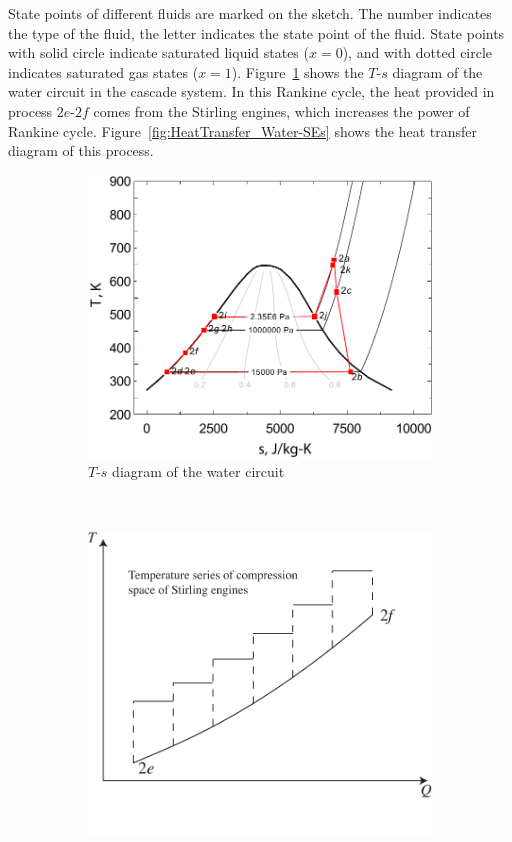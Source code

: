 State points of different fluids are marked on the sketch. The number indicates the type of the fluid, the letter indicates the state point of the fluid. State points with solid circle indicate saturated liquid states ($x = 0$), and with dotted circle indicates saturated gas states ($x = 1$). Figure~\ref{fig:T-s_Water2} shows the $T$-$s$ diagram of the water circuit in the cascade system. In this Rankine cycle, the heat provided in process $2e$-$2f$ comes from the Stirling engines, which increases the power of Rankine cycle. Figure~\ref{fig:HeatTransfer_Water-SEs} shows the heat transfer diagram of this process.

\noindent \begin{figure}[htbp]
\centering
	\begin{subfigure}[b]{0.45\columnwidth}
	\includegraphics[width = \columnwidth]{fig/T-s_Water2}
	\caption{$T$-$s$ diagram of the water circuit}\label{fig:T-s_Water2}
	\end{subfigure}
	~
\begin{subfigure}[b]{0.45\columnwidth}
	\includegraphics[width = \columnwidth]{fig/HeatTransfer_Water-SEs}

\end{subfigure}
\end{figure}
